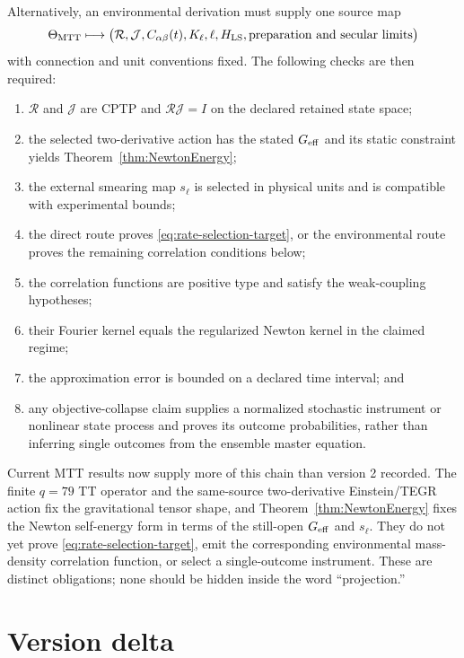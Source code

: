 \documentclass[11pt]{article}
\newcommand{\R}{\mathcal R}
\newcommand{\J}{\mathcal J}
\begin{document}
Alternatively, an environmental derivation must supply one source map
\[
\Theta_{\rm MTT}\longmapsto
 \bigl(\R,\J,C_{\alpha\beta}(t),K_\ell,\ell,
 H_{\rm LS},\text{preparation and secular limits}\bigr)
\]
with connection and unit conventions fixed. The following checks are then required:
\begin{enumerate}
\item $\R$ and $\J$ are CPTP and $\R\J=I$ on the declared retained state space;
\item the selected two-derivative action has the stated $G_{\rm eff}$ and its
static constraint yields Theorem~\ref{thm:NewtonEnergy};
\item the external smearing map $s_\ell$ is selected in physical units and is
compatible with experimental bounds;
\item the direct route proves \eqref{eq:rate-selection-target}, or the environmental
route proves the remaining correlation conditions below;
\item the correlation functions are positive type and satisfy the weak-coupling
hypotheses;
\item their Fourier kernel equals the regularized Newton kernel in the claimed regime;
\item the approximation error is bounded on a declared time interval; and
\item any objective-collapse claim supplies a normalized stochastic instrument or
nonlinear state process and proves its outcome probabilities, rather than inferring
single outcomes from the ensemble master equation.
\end{enumerate}

Current MTT results now supply more of this chain than version 2 recorded. The finite
$q=79$ TT operator and the same-source two-derivative Einstein/TEGR action fix the
gravitational tensor shape, and Theorem~\ref{thm:NewtonEnergy} fixes the Newton
self-energy form in terms of the still-open $G_{\rm eff}$ and $s_\ell$. They do not
yet prove \eqref{eq:rate-selection-target}, emit the corresponding environmental
mass-density correlation function, or select a single-outcome instrument. These are
distinct obligations; none should be hidden inside the word ``projection.''

\section{Version delta}
\end{document}

